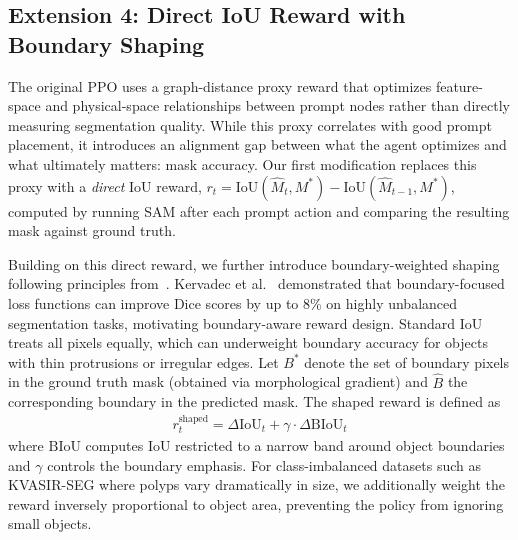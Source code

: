 \documentclass[journal, onecolumn]{IEEEtran}
\begin{document}
\subsection{Extension 4: Direct IoU Reward with Boundary Shaping}

The original PPO uses a graph-distance proxy reward that optimizes feature-space and physical-space relationships between prompt nodes rather than directly measuring segmentation quality. While this proxy correlates with good prompt placement, it introduces an alignment gap between what the agent optimizes and what ultimately matters: mask accuracy. Our first modification replaces this proxy with a \textit{direct} IoU reward, $r_t = \text{IoU}(\hat{M}_t, M^*) - \text{IoU}(\hat{M}_{t-1}, M^*)$, computed by running SAM after each prompt action and comparing the resulting mask against ground truth.

Building on this direct reward, we further introduce boundary-weighted shaping following principles from~\cite{Ng1999RewardShaping}. Kervadec et al.~\cite{Kervadec2019BoundaryLoss} demonstrated that boundary-focused loss functions can improve Dice scores by up to 8\% on highly unbalanced segmentation tasks, motivating boundary-aware reward design. Standard IoU treats all pixels equally, which can underweight boundary accuracy for objects with thin protrusions or irregular edges. Let $B^*$ denote the set of boundary pixels in the ground truth mask (obtained via morphological gradient) and $\hat{B}$ the corresponding boundary in the predicted mask. The shaped reward is defined as
\begin{align}
r_t^{\text{shaped}} = \Delta\text{IoU}_t + \gamma \cdot \Delta\text{BIoU}_t
\label{eq:boundary_reward}
\end{align}
where $\text{BIoU}$ computes IoU restricted to a narrow band around object boundaries and $\gamma$ controls the boundary emphasis. For class-imbalanced datasets such as KVASIR-SEG where polyps vary dramatically in size, we additionally weight the reward inversely proportional to object area, preventing the policy from ignoring small objects.
\end{document}
